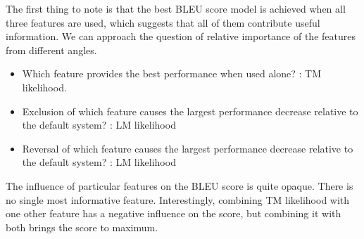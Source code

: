 The first thing to note is that the best BLEU score model is achieved when all three features are used, which suggests that all of them contribute useful information. We can approach the question of relative importance of the features from different angles.
\begin{itemize}
	\item Which feature provides the best performance when used alone? : TM likelihood.
	\item Exclusion of which feature causes the largest performance decrease relative to the default system? : LM likelihood
	\item Reversal of which feature causes the largest performance decrease relative to the default system? : LM likelihood
\end{itemize}

The influence of particular features on the BLEU score is quite opaque. There is no single most informative feature. Interestingly, combining TM likelihood with one other feature has a negative influence on the score, but combining it with both brings the score to maximum.  
